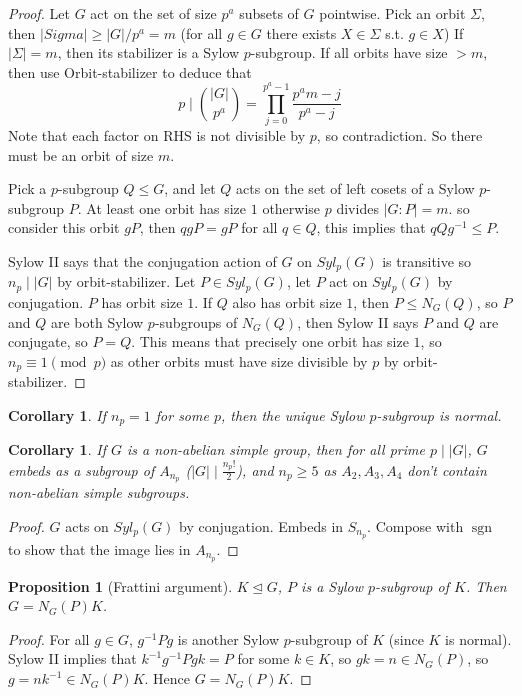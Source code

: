 \documentclass{article}
\theoremstyle{definition}
\theoremstyle{remark}
\theoremstyle{plain}
\newtheorem{prop}[defn]{Proposition}
\newtheorem{crly}[defn]{Corollary}
\theoremstyle{definition}
\begin{document}
\begin{proof}
    Let $G$ act on the set of size $p^a$ subsets of $G$ pointwise. Pick an orbit $\Sigma$, then $|Sigma|\ge |G|/p^a=m$ (for all $g\in G$ there exists $X\in\Sigma$ s.t. $g\in X$) If $|\Sigma|=m$, then its stabilizer is a Sylow $p$-subgroup. If all orbits have size $> m$, then use Orbit-stabilizer to deduce that $$p\mid \binom{|G|}{p^a}=\prod_{j=0}^{p^a-1}\dfrac{p^am-j}{p^a-j}$$ Note that each factor on RHS is not divisible by $p$, so contradiction. So there must be an orbit of size $m$.

    Pick a $p$-subgroup $Q\le G$, and let $Q$ acts on the set of left cosets of a Sylow $p$-subgroup $P$. At least one orbit has size $1$ otherwise $p$ divides $|G:P|=m$. so consider this orbit $gP$, then $qgP=gP$ for all $q\in Q$, this implies that $qQg^{-1}\le P$.

    Sylow II says that the conjugation action of $G$ on $Syl_p(G)$ is transitive so $n_p\mid |G|$ by orbit-stabilizer. Let $P\in Syl_p(G)$, let $P$ act on $Syl_p(G)$ by conjugation. $P$ has orbit size $1$. If $Q$ also has orbit size $1$, then $P\le N_G(Q)$, so $P$ and $Q$ are both Sylow $p$-subgroups of $N_G(Q)$, then Sylow II says $P$ and $Q$ are conjugate, so $P=Q$. This means that precisely one orbit has size $1$, so $n_p\equiv 1\pmod{p}$ as other orbits must have size divisible by $p$ by orbit-stabilizer.
\end{proof}
\begin{crly}
    If $n_p=1$ for some $p$, then the unique Sylow $p$-subgroup is normal.
\end{crly}
\begin{crly}
    If $G$ is a non-abelian simple group, then for all prime $p\mid |G|$, $G$ embeds as a subgroup of $A_{n_p}$ ($|G|\mid \frac{n_p!}{2}$), and $n_p\ge 5$ as $A_2, A_3, A_4$ don't contain non-abelian simple subgroups. 
\end{crly}
\begin{proof}
    $G$ acts on $Syl_p(G)$ by conjugation. Embeds in $S_{n_p}$. Compose with $\operatorname{sgn}$ to show that the image lies in $A_{n_p}$.
\end{proof}
\begin{prop}[Frattini argument]
    $K\trianglelefteq G$, $P$ is a Sylow $p$-subgroup of $K$. Then $G=N_G(P)K$.
\end{prop}
\begin{proof}
    For all $g\in G$, $g^{-1}Pg$ is another Sylow $p$-subgroup of $K$ (since $K$ is normal). Sylow II implies that $k^{-1}g^{-1}Pgk=P$ for some $k\in K$, so $gk=n\in N_G(P)$, so $g=nk^{-1}\in N_G(P)K$. Hence $G=N_G(P)K$.
\end{proof}
\end{document}
